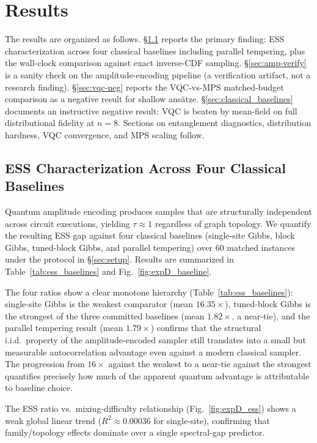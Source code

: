 \documentclass[conference,10pt]{IEEEtran}
\begin{document}
\section{Results}

The results are organized as follows. \S\ref{sec:ess} reports the primary finding: ESS characterization across four classical baselines including parallel tempering, plus the wall-clock comparison against exact inverse-CDF sampling. \S\ref{sec:amp-verify} is a sanity check on the amplitude-encoding pipeline (a verification artifact, not a research finding). \S\ref{sec:vqc-neg} reports the VQC-vs-MPS matched-budget comparison as a negative result for shallow ans\"atze. \S\ref{sec:classical_baselines} documents an instructive negative result: VQC is beaten by mean-field on full distributional fidelity at $n=8$. Sections on entanglement diagnostics, distribution hardness, VQC convergence, and MPS scaling follow.

\subsection{ESS Characterization Across Four Classical Baselines}
\label{sec:ess}

Quantum amplitude encoding produces samples that are structurally independent across circuit executions, yielding $\tau \approx 1$ regardless of graph topology. We quantify the resulting ESS gap against four classical baselines (single-site Gibbs, block Gibbs, tuned-block Gibbs, and parallel tempering) over 60 matched instances under the protocol in \S\ref{sec:setup}. Results are summarized in Table~\ref{tab:ess_baselines} and Fig.~\ref{fig:expD_baseline}.

The four ratios show a clear monotone hierarchy (Table~\ref{tab:ess_baselines}): single-site Gibbs is the weakest comparator (mean $16.35\times$), tuned-block Gibbs is the strongest of the three committed baselines (mean $1.82\times$, a near-tie), and the parallel tempering result (mean $1.79\times$) confirms that the structural i.i.d.\ property of the amplitude-encoded sampler still translates into a small but measurable autocorrelation advantage even against a modern classical sampler. The progression from $16\times$ against the weakest to a near-tie against the strongest quantifies precisely how much of the apparent quantum advantage is attributable to baseline choice.

The ESS ratio vs.\ mixing-difficulty relationship (Fig.~\ref{fig:expD_ess}) shows a weak global linear trend ($R^2\approx 0.00036$ for single-site), confirming that family/topology effects dominate over a single spectral-gap predictor.
\end{document}
